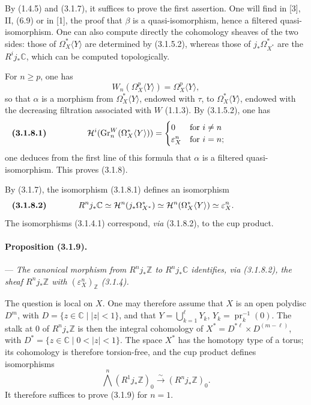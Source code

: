 \documentclass[10pt]{article}
\newcommand{\C}{\mathbb C}
\newcommand{\Z}{\mathbb Z}
\newcommand{\Gr}{\operatorname{Gr}}
\begin{document}
By (1.4.5) and (3.1.7), it suffices to prove the first assertion. One will find in [3], II, (6.9) or in [1], the proof that $\beta$ is a quasi-isomorphism, hence a filtered quasi-isomorphism. One can also compute directly the cohomology sheaves of the two sides: those of $\Omega_X^*\langle Y\rangle$ are determined by (3.1.5.2), whereas those of $j_*\Omega_{X^*}^*$ are the $R^ij_*\C$, which can be computed topologically.

For $n\ge p$, one has
\[
W_n(\Omega_X^p\langle Y\rangle)=\Omega_X^p\langle Y\rangle,
\]
so that $\alpha$ is a morphism from $\Omega_X^*\langle Y\rangle$, endowed with $\tau$, to $\Omega_X^*\langle Y\rangle$, endowed with the decreasing filtration associated with $W$ (1.1.3). By (3.1.5.2), one has
\[
\makebox[\textwidth][s]{\textbf{(3.1.8.1)}\hfill$\displaystyle \mathcal H^i(\Gr_n^W(\Omega_X^*\langle Y\rangle))=\begin{cases}0&\text{for }i\ne n\\ \varepsilon_X^n&\text{for }i=n;\end{cases}$\hfill\phantom{\textbf{(3.1.8.1)}}}
\]
one deduces from the first line of this formula that $\alpha$ is a filtered quasi-isomorphism. This proves (3.1.8).

By (3.1.7), the isomorphism (3.1.8.1) defines an isomorphism
\[
\makebox[\textwidth][s]{\textbf{(3.1.8.2)}\hfill$\displaystyle R^nj_*\C\simeq \mathcal H^n(j_*\Omega_{X^*}^*)\simeq \mathcal H^n(\Omega_X^*\langle Y\rangle)\simeq \varepsilon_X^n.$\hfill\phantom{\textbf{(3.1.8.2)}}}
\]
The isomorphisms (3.1.4.1) correspond, \emph{via} (3.1.8.2), to the cup product.

\paragraph{Proposition (3.1.9).} --- {\itshape The canonical morphism from $R^nj_*\Z$ to $R^nj_*\C$ identifies, via (3.1.8.2), the sheaf $R^nj_*\Z$ with $(\varepsilon_X^n)_\Z$ (3.1.4).}

The question is local on $X$. One may therefore assume that $X$ is an open polydisc $D^m$, with $D=\{z\in\C\mid |z|<1\}$, and that $Y=\bigcup_{k=1}^{\ell}Y_k$, $Y_k=\operatorname{pr}_k^{-1}(0)$. The stalk at $0$ of $R^nj_*\Z$ is then the integral cohomology of $X^*=D^{*\ell}\times D^{(m-\ell)}$, with $D^*=\{z\in\C\mid 0<|z|<1\}$.
The space $X^*$ has the homotopy type of a torus; its cohomology is therefore torsion-free, and the cup product defines isomorphisms
\[
\bigwedge^n(R^1j_*\Z)_0\xrightarrow{\sim}(R^nj_*\Z)_0.
\]
It therefore suffices to prove (3.1.9) for $n=1$.
\end{document}
